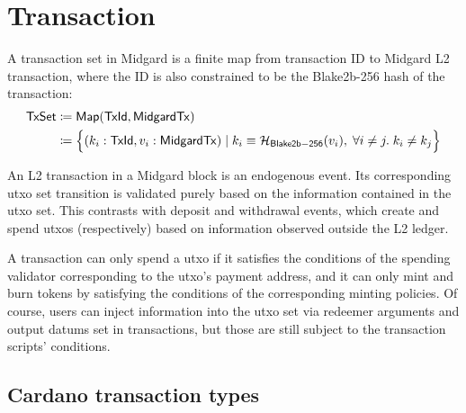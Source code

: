 \documentclass[../midgard.tex]{subfiles}
\begin{document}
\section{Transaction}
\label{h:transaction}

A transaction set in Midgard is a finite map from transaction ID to Midgard L2 transaction, where the ID is also constrained to be the Blake2b-256 hash of the transaction:
\begin{align*}
    \mathsf{TxSet} &\coloneq \mathsf{Map(TxId, MidgardTx)} \\
      &\coloneq \Bigl\{
        (k_i: \mathsf{TxId}, v_i: \mathsf{MidgardTx}) \mid 
        k_i \equiv \mathcal{H}_{\mathsf{Blake2b-256}}(v_i) ,\;
        \forall i \neq j.\; k_i \neq k_j
    \Bigr\}
\end{align*}

An L2 transaction in a Midgard block is an endogenous event.
Its corresponding utxo set transition is validated purely based on the information contained in the utxo set.
This contrasts with deposit and withdrawal events, which create and spend utxos (respectively) based on information observed outside the L2 ledger.

A transaction can only spend a utxo if it satisfies the conditions of the spending validator corresponding to the utxo's payment address, and it can only mint and burn tokens by satisfying the conditions of the corresponding minting policies.
Of course, users can inject information into the utxo set via redeemer arguments and output datums set in transactions, but those are still subject to the transaction scripts' conditions.

\subsection{Cardano transaction types}
\label{h:cardano-transaction-types}
\end{document}
